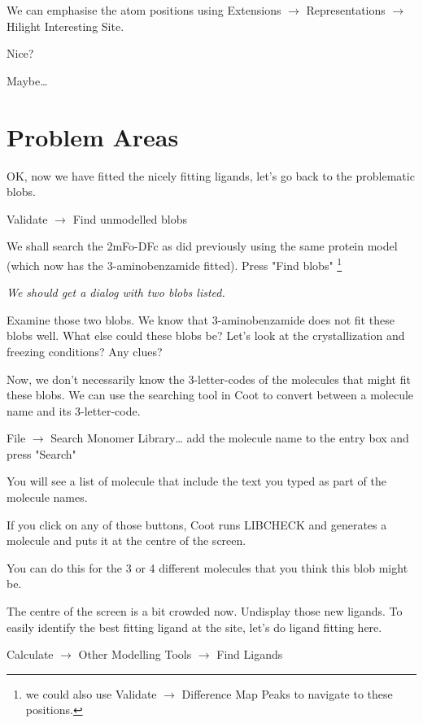 \documentclass{article}
\begin{document}
 We can emphasise the atom positions using 
 \textsf{Extensions $\rightarrow$ Representations $\rightarrow$ Hilight Interesting Site}.

 \begin{trivlist}
 \item Nice?

 \textsf{Maybe\ldots}
 \end{trivlist}

\section{Problem Areas}

OK, now we have fitted the nicely fitting ligands, let's go back to
the problematic blobs.

 \textsf{Validate $\rightarrow$ Find unmodelled blobs}

 We shall search the 2mFo-DFc as did previously using the same protein
 model (which now has the 3-aminobenzamide fitted).  Press "Find
 blobs" \footnote{we could also use \textsf{Validate $\rightarrow$
     Difference Map Peaks} to navigate to these positions.}

\textsl{ We should get a dialog with two blobs listed.}
 
Examine those two blobs.  We know that 3-aminobenzamide does not fit
these blobs well.  What else could these blobs be?  Let's look at the
crystallization and freezing conditions?  Any clues?

 Now, we don't necessarily know the 3-letter-codes of the molecules
 that might fit these blobs. We can use the searching tool in Coot to
 convert between a molecule name and its 3-letter-code.  

 \textsf{File $\rightarrow$ Search Monomer Library\ldots}
 add the molecule name to the entry box and press "Search"

 You will see a list of molecule that include the text you typed as
 part of the molecule names.

 If you click on any of those buttons, Coot runs LIBCHECK and
 generates a molecule and puts it at the centre of the screen.

 You can do this for the 3 or 4 different molecules that you think
 this blob might be.

 The centre of the screen is a bit crowded now.  Undisplay those new
 ligands.  To easily identify the best fitting ligand at the site,
 let's do ligand fitting here.

 \textsf{Calculate $\rightarrow$ Other Modelling Tools $\rightarrow$
   Find Ligands }
\end{document}
